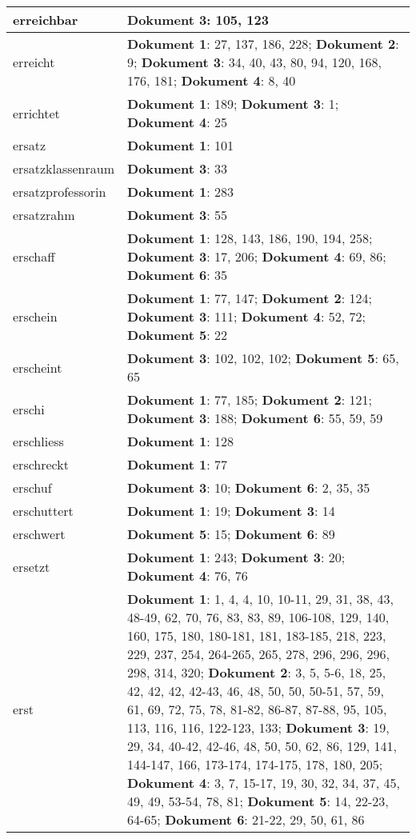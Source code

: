 \documentclass[a5paper]{article}
\begin{document}
\begin{longtable}[l]{|l|p{3in}|}
\hline
erreichbar & \textbf{Dokument 3}: 105, 123 \\
\hline
erreicht & \textbf{Dokument 1}: 27, 137, 186, 228; \textbf{Dokument 2}: 9; \textbf{Dokument 3}: 34, 40, 43, 80, 94, 120, 168, 176, 181; \textbf{Dokument 4}: 8, 40 \\
\hline
errichtet & \textbf{Dokument 1}: 189; \textbf{Dokument 3}: 1; \textbf{Dokument 4}: 25 \\
\hline
ersatz & \textbf{Dokument 1}: 101 \\
\hline
ersatzklassenraum & \textbf{Dokument 3}: 33 \\
\hline
ersatzprofessorin & \textbf{Dokument 1}: 283 \\
\hline
ersatzrahm & \textbf{Dokument 3}: 55 \\
\hline
erschaff & \textbf{Dokument 1}: 128, 143, 186, 190, 194, 258; \textbf{Dokument 3}: 17, 206; \textbf{Dokument 4}: 69, 86; \textbf{Dokument 6}: 35 \\
\hline
erschein & \textbf{Dokument 1}: 77, 147; \textbf{Dokument 2}: 124; \textbf{Dokument 3}: 111; \textbf{Dokument 4}: 52, 72; \textbf{Dokument 5}: 22 \\
\hline
erscheint & \textbf{Dokument 3}: 102, 102, 102; \textbf{Dokument 5}: 65, 65 \\
\hline
erschi & \textbf{Dokument 1}: 77, 185; \textbf{Dokument 2}: 121; \textbf{Dokument 3}: 188; \textbf{Dokument 6}: 55, 59, 59 \\
\hline
erschliess & \textbf{Dokument 1}: 128 \\
\hline
erschreckt & \textbf{Dokument 1}: 77 \\
\hline
erschuf & \textbf{Dokument 3}: 10; \textbf{Dokument 6}: 2, 35, 35 \\
\hline
erschuttert & \textbf{Dokument 1}: 19; \textbf{Dokument 3}: 14 \\
\hline
erschwert & \textbf{Dokument 5}: 15; \textbf{Dokument 6}: 89 \\
\hline
ersetzt & \textbf{Dokument 1}: 243; \textbf{Dokument 3}: 20; \textbf{Dokument 4}: 76, 76 \\
\hline
erst & \textbf{Dokument 1}: 1, 4, 4, 10, 10-11, 29, 31, 38, 43, 48-49, 62, 70, 76, 83, 83, 89, 106-108, 129, 140, 160, 175, 180, 180-181, 181, 183-185, 218, 223, 229, 237, 254, 264-265, 265, 278, 296, 296, 296, 298, 314, 320; \textbf{Dokument 2}: 3, 5, 5-6, 18, 25, 42, 42, 42, 42-43, 46, 48, 50, 50, 50-51, 57, 59, 61, 69, 72, 75, 78, 81-82, 86-87, 87-88, 95, 105, 113, 116, 116, 122-123, 133; \textbf{Dokument 3}: 19, 29, 34, 40-42, 42-46, 48, 50, 50, 62, 86, 129, 141, 144-147, 166, 173-174, 174-175, 178, 180, 205; \textbf{Dokument 4}: 3, 7, 15-17, 19, 30, 32, 34, 37, 45, 49, 49, 53-54, 78, 81; \textbf{Dokument 5}: 14, 22-23, 64-65; \textbf{Dokument 6}: 21-22, 29, 50, 61, 86 \\

\end{longtable}
\end{document}
